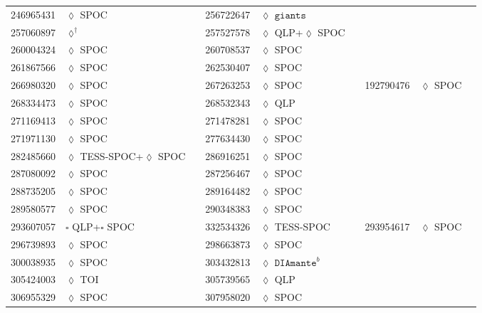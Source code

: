 \begin{longtable}{llrllr}
246965431 & $\lozenge$ SPOC & \cite{TIC_348755728} & 256722647 & $\lozenge$ $\texttt{giants}$ & \cite{TIC_348835438} \\
257060897 & $\lozenge^\dagger$ & \cite{TIC_257060897} & 257527578 & $\lozenge$ QLP+$\lozenge$ SPOC & \cite{TIC_124029677} \\
260004324 & $\lozenge$ SPOC & \cite{TIC_103633434} & 260708537 & $\lozenge$ SPOC & \cite{TIC_260708537} \\
261867566 & $\lozenge$ SPOC & \cite{TIC_261867566} & 262530407 & $\lozenge$ SPOC & \cite{TIC_262530407} \\
266980320 & $\lozenge$ SPOC & \cite{TIC_70513361} & 267263253 & $\lozenge$ SPOC& \cite{TIC_267263253} & 192790476 & $\lozenge$ SPOC & \cite{TIC_428699140} \\
268334473 & $\lozenge$ SPOC & \cite{TIC_232540264} & 268532343 & $\lozenge$ QLP & \cite{TIC_268532343} \\
271169413 & $\lozenge$ SPOC & \cite{TIC_159418353} & 271478281 & $\lozenge$ SPOC & \cite{TIC_428699140} \\
271971130 & $\lozenge$ SPOC & \cite{TIC_271971130} & 277634430 & $\lozenge$ SPOC & \cite{TIC_159418353} \\
282485660 & $\lozenge$ TESS-SPOC+$\lozenge$ SPOC & \cite{TIC_282485660} & 286916251 & $\lozenge$ SPOC & \cite{TIC_232540264} \\
287080092 & $\lozenge$ SPOC & \cite{TIC_232540264} & 287256467 & $\lozenge$ SPOC & \cite{TIC_287256467} \\
288735205 & $\lozenge$ SPOC & \cite{TIC_288735205} & 289164482 & $\lozenge$ SPOC & \cite{TIC_348755728} \\
289580577 & $\lozenge$ SPOC & \cite{TIC_232540264} & 290348383 & $\lozenge$ SPOC & \cite{TIC_290348383} \\
293607057 & $\square$ QLP+$\square$ SPOC& \cite{TIC_293607057} & 332534326 & $\lozenge$ TESS-SPOC & \cite{TIC_332534326} & 293954617 & $\lozenge$ SPOC & \cite{TIC_293954617} \\
296739893 & $\lozenge$ SPOC & \cite{TIC_296739893} & 298663873 & $\lozenge$ SPOC & \cite{TIC_298663873} \\
300038935 & $\lozenge$ SPOC & \cite{TIC_300038935} & 303432813 & $\lozenge$ $\texttt{DIAmante}^b$ & \cite{TIC_303432813} \\
305424003 & $\lozenge$ TOI & \cite{TIC_154872375} & 305739565 & $\lozenge$ QLP & \cite{TIC_305739565} \\
306955329 & $\lozenge$ SPOC & \cite{TIC_232540264} & 307958020 & $\lozenge$ SPOC & \cite{TIC_307958020} \\

\end{longtable}
